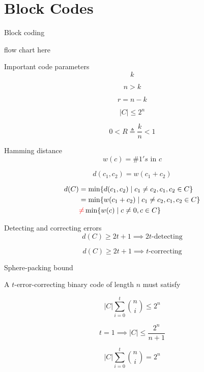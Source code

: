 \section{Block Codes}

\begin{frame}{Block coding}
  \centerline{flow chart here}
\end{frame}
\begin{frame}{Important code parameters}
  \[
	k
  \]

  \[
	n > k
  \]

  \[
	r = n - k
  \]

  \[
	|C| \le 2^n
  \]

  \[
	0 < R \triangleq \frac{k}{n} < 1
  \]
\end{frame}
\begin{frame}{Hamming distance}
  \[
	w(c) = \# 1's \text{ in } c
  \]

  \[
	d(c_1, c_2) = w(c_1 + c_2)
  \]

  \[
	\begin{aligned}
	  d(C) &= \min \{d(c_1, c_2) \mid c_1 \neq c_2, c_1, c_2 \in C\} \\
	  &= \min \{w(c_1 + c_2) \mid c_1 \neq c_2, c_1, c_2 \in C\} \\
	  &\textcolor{red}{\neq} \min \{w(c) \mid c \neq 0, c \in C\}
	\end{aligned}
  \]
\end{frame}
\begin{frame}{Detecting and correcting errors}
  \[
	d(C) \ge 2t + 1 \implies 2t\text{-detecting}
  \]

  \[
	d(C) \ge 2t + 1 \implies t\text{-correcting}
  \]
\end{frame}
\begin{frame}{Sphere-packing bound}
  \begin{theorem}
	A $t$-error-correcting binary code of length $n$ must satisfy

	\[
	  |C| \sum_{i=0}^{t} \binom{n}{i} \le 2^n
	\]
  \end{theorem}

  \[
	t = 1 \implies |C| \le \frac{2^n}{n + 1}
  \]

  \begin{definition}
	\[
	  |C| \sum_{i=0}^{t} \binom{n}{i} = 2^n
	\]
  \end{definition}
\end{frame}
